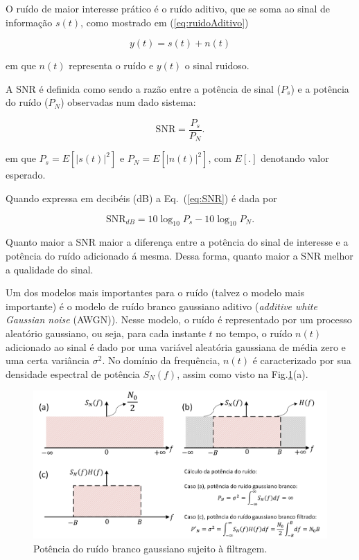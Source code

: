 \documentclass[12pt,addpoints]{exam}
\begin{document}
O ruído de maior interesse prático é o ruído aditivo, que se soma ao sinal de informação $s(t)$, como mostrado em (\ref{eq:ruidoAditivo})

\begin{equation}\label{eq:ruidoAditivo}
y(t) = s(t) + n(t)
\end{equation}

\noindent em que $n(t)$ representa o ruído e $y(t)$ o sinal ruidoso.

A SNR é definida como sendo a razão entre a potência de sinal ($P_s$) e a potência do ruído ($P_N$) observadas num dado sistema:

\begin{equation}\label{eq:SNR}
 \mathrm{SNR} = \frac{P_s}{P_N}.
\end{equation}

\noindent em que $P_s = E[|s(t)|^2]$ e $P_N=E[|n(t)|^2]$, com $E[.]$ denotando valor esperado.

Quando expressa em decibéis (dB) a Eq.~(\ref{eq:SNR}) é dada por

\begin{equation}\label{eq:SNRdB}
 \mathrm{SNR}_{dB} = 10\log_{10}P_s-10\log_{10}P_N.
\end{equation}

Quanto maior a SNR maior a diferença entre a potência do sinal de interesse e a potência do ruído adicionado á mesma. Dessa forma, quanto maior a SNR melhor a qualidade do sinal.

Um dos modelos mais importantes para o ruído (talvez o modelo mais importante) é o modelo de ruído branco gaussiano aditivo (\textit{additive white Gaussian noise} (AWGN)). Nesse modelo, o ruído é representado por um processo aleatório gaussiano, ou seja, para cada instante $t$ no tempo, o ruído $n(t)$ adicionado ao sinal é dado por uma variável aleatória gaussiana de média zero e uma certa variância $\sigma^2$. No domínio da frequência, $n(t)$ é caracterizado por sua densidade espectral de potência $S_N(f)$, assim como visto na Fig.\ref{fig:ruidoFiltrado}(a). 

\begin{figure}[h!]
        \centering
        \includegraphics[width=0.9\linewidth]{./Figuras/FiltragemRuidoBranco}
        \caption{Potência do ruído branco gaussiano sujeito à filtragem.} 
        \label{fig:ruidoFiltrado}
\end{figure}
\end{document}
